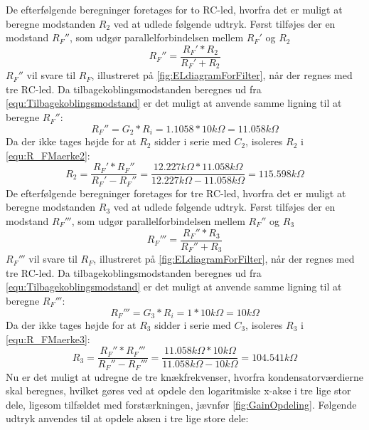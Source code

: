 De efterfølgende beregninger foretages for to RC-led, hvorfra det er muligt at beregne modstanden $R_2$ ved at udlede følgende udtryk. Først tilføjes der en modstand $R_F''$, som udgør parallelforbindelsen mellem $R_F'$ og $R_2$
%
\begin{equation}
	R_F'' = \frac{R_F'*R_2}{R_F'+R_2}
	\label{equ:R_FMaerke2}
\end{equation}
%
$R_F''$ vil svare til $R_F$, illustreret på \autoref{fig:ELdiagramForFilter}, når der regnes med tre RC-led. Da tilbagekoblingsmodstanden beregnes ud fra \autoref{equ:Tilbagekoblingsmodstand} er det muligt at anvende samme ligning til at beregne $R_F''$:
%
\begin{equation}
	R_F'' = G_2*R_i = 1.1058*10k\Omega = 11.058k\Omega	
\end{equation}
%
Da der ikke tages højde for at $R_2$ sidder i serie med $C_2$, isoleres $R_2$ i \autoref{equ:R_FMaerke2}:
%
\begin{equation}
	R_2 = \frac{R_F'*R_F''}{R_F'-R_F''} = \frac{12.227k\Omega*11.058k\Omega}{12.227k\Omega-11.058k\Omega} = 115.598k\Omega
\end{equation}  
%
De efterfølgende beregninger foretages for tre RC-led, hvorfra det er muligt at beregne modstanden $R_3$ ved at udlede følgende udtryk. Først tilføjes der en modstand $R_F'''$, som udgør parallelforbindelsen mellem $R_F''$ og $R_3$
%
\begin{equation}
	R_F''' = \frac{R_F''*R_3}{R_F''+R_3}
	\label{equ:R_FMaerke3}
\end{equation}
%
$R_F'''$ vil svare til $R_F$, illustreret på \autoref{fig:ELdiagramForFilter}, når der regnes med tre RC-led. Da tilbagekoblingsmodstanden beregnes ud fra \autoref{equ:Tilbagekoblingsmodstand} er det muligt at anvende samme ligning til at beregne $R_F'''$:
%
\begin{equation}
	R_F''' = G_3*R_i = 1*10k\Omega = 10k\Omega	
\end{equation}
%
Da der ikke tages højde for at $R_3$ sidder i serie med $C_3$, isoleres $R_3$ i \autoref{equ:R_FMaerke3}:
%
\begin{equation}
	R_3 = \frac{R_F''*R_F'''}{R_F''-R_F'''} = \frac{11.058k\Omega*10k\Omega}{11.058k\Omega-10k\Omega} = 104.541k\Omega
\end{equation}  
%
Nu er det muligt at udregne de tre knækfrekvenser, hvorfra kondensatorværdierne skal beregnes, hvilket gøres ved at opdele den logaritmiske x-akse i tre lige stor dele, ligesom tilfældet med forstærkningen, jævnfør \autoref{fig:GainOpdeling}. Følgende udtryk anvendes til at opdele aksen i tre lige store dele:
